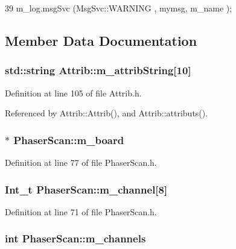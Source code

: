 \begin{DoxyCode}
39 { m_log.msgSvc (MsgSvc::WARNING , mymsg, m_name ); }
\end{DoxyCode}


\subsection{Member Data Documentation}
\hypertarget{classAttrib_a3414521d7a82476e874b25a5407b5e63}{
\subsubsection[{m\_\-attribString}]{\setlength{\rightskip}{0pt plus 5cm}std::string {\bf Attrib::m\_\-attribString}\mbox{[}10\mbox{]}}}
\label{classAttrib_a3414521d7a82476e874b25a5407b5e63}


Definition at line 105 of file Attrib.h.

Referenced by Attrib::Attrib(), and Attrib::attributs().\hypertarget{classPhaserScan_aec1f340810d0cf1f98155673385ffff5}{
\subsubsection[{m\_\-board}]{$\ast$ {\bf PhaserScan::m\_\-board}}}
\label{classPhaserScan_aec1f340810d0cf1f98155673385ffff5}


Definition at line 77 of file PhaserScan.h.\hypertarget{classPhaserScan_a983fb003ef3c41d1dcf1078247548d82}{
\subsubsection[{m\_\-channel}]{\setlength{\rightskip}{0pt plus 5cm}Int\_\-t {\bf PhaserScan::m\_\-channel}\mbox{[}8\mbox{]}}}
\label{classPhaserScan_a983fb003ef3c41d1dcf1078247548d82}


Definition at line 71 of file PhaserScan.h.\hypertarget{classPhaserScan_a3e9894ae646ed25d26a07532c1a2b8b7}{
\subsubsection[{m\_\-channels}]{\setlength{\rightskip}{0pt plus 5cm}int {\bf PhaserScan::m\_\-channels}}}
\label{classPhaserScan_a3e9894ae646ed25d26a07532c1a2b8b7}


